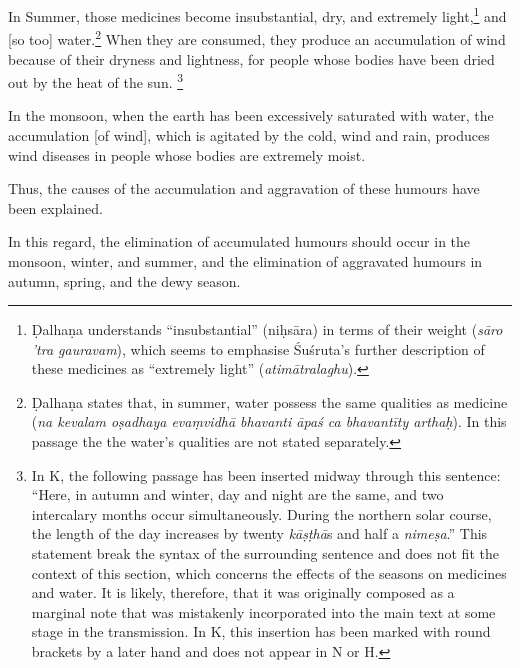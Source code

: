 \begin{translation}
	In Summer, those medicines %
	become insubstantial, dry, and extremely light,\footnote{%
		Ḍalhaṇa \citep[26]{vulgate} understands ``insubstantial'' (niḥsāra) in terms of their weight (\emph{sāro ’tra gauravam}), which seems to emphasise Śuśruta's further description of these medicines as ``extremely light'' (\emph{atimātralaghu}).}
	and [so too] water.\footnote{%
		Ḍalhaṇa \citep[26]{vulgate} states that, in summer, water possess the same qualities as medicine (\emph{na kevalam oṣadhaya evaṃvidhā bhavanti āpaś ca bhavantīty arthaḥ}). In this passage the  the water's qualities are not stated separately.}
	When they are consumed, %
	they produce an accumulation of wind because of their dryness and lightness, %
	for people whose bodies have been dried out by the heat of the sun.%
	\footnote{%
		In K, the following passage has been inserted midway through this sentence: ``Here, in autumn and winter, day and night are the same, and two intercalary months occur simultaneously. During the northern solar course, the length of the day increases by twenty \emph{kāṣṭhā}s and half a \emph{nimeṣa}.'' This statement break the syntax of the surrounding sentence and does not fit the context of this section, which concerns the effects of the seasons on medicines and water. It is likely, therefore, that it was originally composed as a marginal note that was mistakenly incorporated into the main text at some stage in the transmission. In K, this insertion has been marked with round brackets by a later hand and does not appear in N or H.} %

	In the monsoon, %
	when the earth has been excessively saturated with water, %
	the accumulation [of wind], which is agitated by the cold, wind and rain, %
	produces wind diseases %
	in people whose bodies are extremely moist. %

	Thus, the causes of the accumulation and aggravation of these humours have been explained.

	\item [12]
	In this regard, the elimination of accumulated humours should occur in the monsoon, winter, and summer, and the elimination of aggravated humours in autumn, spring, and the dewy season.


\end{translation}

